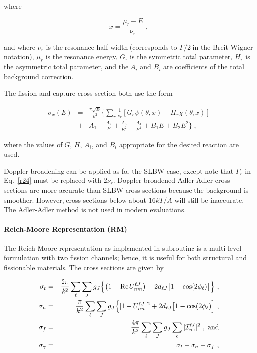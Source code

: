 \noindent where

\begin{equation}
  x={\frac{\mu_r-E}{\nu_r}}\,\,,
\end{equation}
\vspace{0.5 pt}

\noindent and where $\nu_r$ is the resonance half-width (corresponds
to $\Gamma /2$ in the Breit-Wigner notation), $\mu_r$ is the
resonance energy, $G_r$ is the symmetric total parameter,
$H_r$ is the asymmetric total parameter, and the $A_i$ and
$B_i$ are coefficients of the total background correction.

The fission and capture cross section both use the form

\begin{eqnarray}
  \sigma_x(E)&=&{\frac{\pi\sqrt{E}}{k^2}}
    \biggl\lbrace \sum_r {\frac{1}{\nu_r}}
    \left[G_r\psi(\theta,x)+H_r\chi(\theta,x)\right]\nonumber\\
  &+&A_1+{\frac{A_2}{E}}+{\frac{A_3}{E^2}}
    +{\frac{A_4}{E^4}}+B_1E+B_2E^2 \biggr\rbrace \,\,,
\end{eqnarray}

\noindent where the values of $G$, $H$, $A_i$, and $B_i$
appropriate for the desired reaction are used.

Doppler-broadening can be applied
as for the SLBW case, except note
that $\Gamma_r$ in Eq.~\ref{r24} must be replaced with $2\nu_r$.
Doppler-broadened Adler-Adler cross sections are more accurate
than SLBW cross sections because the background is smoother.
However, cross sections below about $16kT/A$ will still be
inaccurate.  The Adler-Adler method is not used in modern
evaluations.

\paragraph{Reich-Moore Representation (RM)}
The Reich-Moore representation
as implemented in subroutine 
is a multi-level formulation with two fission channels; hence,
it is useful for both structural and fissionable materials.
The cross sections are given by

\begin{eqnarray}
    \sigma_t&=&{\frac{2\pi}{k^2}}\sum_\ell\sum_J
        g_J \Bigl\{ \bigl( 1-{\rm Re}\,U_{nm}^{\ell J}
        \bigr) + 2d_{\ell J}\bigl[1-\cos(2\phi_\ell)
        \bigr]\Bigr\} \,\,,\\
    \sigma_n&=&{\frac{\pi}{k^2}}\sum_\ell\sum_J
      g_J \Bigl\{ | 1-U_{nn}^{\ell J} |^2
         + 2d_{\ell J}\bigl[1-\cos(2\phi_\ell) \Bigr]
        \,\,,\\
    \sigma_f&=&{\frac{4\pi}{k^2}}\sum_\ell\sum_J
      g_J \sum_c |{\cal I}_{nc}^{\ell J} |^2 \,\,,\;\hbox{and}\\
  \sigma_\gamma&=&\sigma_t-\sigma_n-\sigma_f \,\,,
\end{eqnarray}

